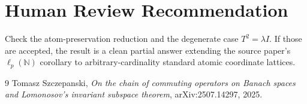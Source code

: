 \documentclass[11pt]{article}
\newcommand{\N}{\mathbb{N}}
\begin{document}
\section*{Human Review Recommendation}

Check the atom-preservation reduction and the degenerate case $T^2=\lambda I$.
If those are accepted, the result is a clean partial answer extending the
source paper's $\ell_p(\N)$ corollary to arbitrary-cardinality standard atomic
coordinate lattices.

\begin{thebibliography}{9}
Tomasz Szczepanski,
\emph{On the chain of commuting operators on Banach spaces and Lomonosov's
invariant subspace theorem}, arXiv:2507.14297, 2025.
\end{thebibliography}
\end{document}
